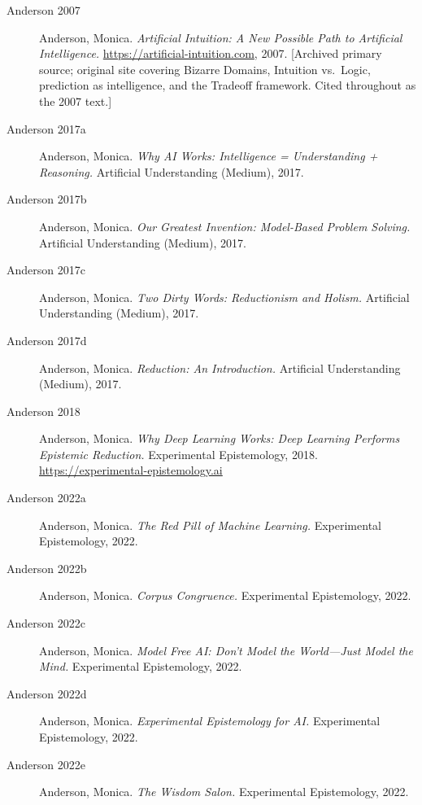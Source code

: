 \documentclass[12pt, a4paper, oneside]{book}
\begin{document}
\begin{description}

\item[Anderson 2007] Anderson, Monica.
  \textit{Artificial Intuition: A New Possible Path to Artificial Intelligence.}
  \url{https://artificial-intuition.com}, 2007.
  [Archived primary source; original site covering Bizarre Domains,
  Intuition vs.\ Logic, prediction as intelligence, and the Tradeoff
  framework. Cited throughout as the 2007 text.]

\item[Anderson 2017a] Anderson, Monica.
  \textit{Why AI Works: Intelligence = Understanding + Reasoning.}
  Artificial Understanding (Medium), 2017.

\item[Anderson 2017b] Anderson, Monica.
  \textit{Our Greatest Invention: Model-Based Problem Solving.}
  Artificial Understanding (Medium), 2017.

\item[Anderson 2017c] Anderson, Monica.
  \textit{Two Dirty Words: Reductionism and Holism.}
  Artificial Understanding (Medium), 2017.

\item[Anderson 2017d] Anderson, Monica.
  \textit{Reduction: An Introduction.}
  Artificial Understanding (Medium), 2017.

\item[Anderson 2018] Anderson, Monica.
  \textit{Why Deep Learning Works: Deep Learning Performs Epistemic Reduction.}
  Experimental Epistemology, 2018. \url{https://experimental-epistemology.ai}

\item[Anderson 2022a] Anderson, Monica.
  \textit{The Red Pill of Machine Learning.}
  Experimental Epistemology, 2022.

\item[Anderson 2022b] Anderson, Monica.
  \textit{Corpus Congruence.}
  Experimental Epistemology, 2022.

\item[Anderson 2022c] Anderson, Monica.
  \textit{Model Free AI: Don't Model the World---Just Model the Mind.}
  Experimental Epistemology, 2022.

\item[Anderson 2022d] Anderson, Monica.
  \textit{Experimental Epistemology for AI.}
  Experimental Epistemology, 2022.

\item[Anderson 2022e] Anderson, Monica.
  \textit{The Wisdom Salon.}
  Experimental Epistemology, 2022.


\end{description}
\end{document}
